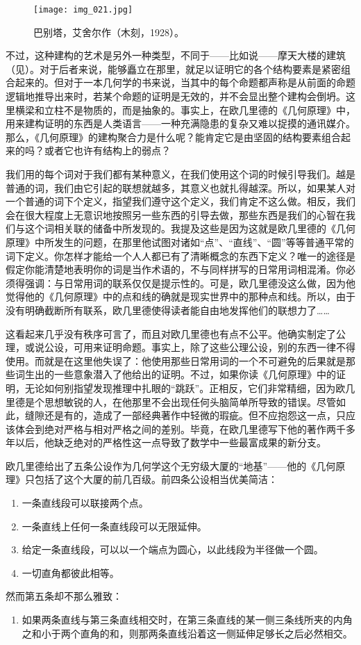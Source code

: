 \begin{figure}
\texttt{[image: img\_021.jpg]}
\caption[巴别塔，艾舍尔作。]
  {巴别塔，艾舍尔作（木刻，1928）。}
\end{figure}

不过，这种建构的艺术是另外一种类型，不同于——比如说——摩天大楼的建筑（见）。对于后者来说，能够矗立在那里，就足以证明它的各个结构要素是紧密组合起来的。但对于一本几何学的书来说，当其中的每个命题都声称是从前面的命题逻辑地推导出来时，若某个命题的证明是无效的，并不会显出整个建构会倒坍。这里横梁和立柱不是物质的，而是抽象的。事实上，在欧几里德的《几何原理》中，用来建构证明的东西是人类语言——一种充满隐患的复杂又难以捉摸的通讯媒介。那么，《几何原理》的建构聚合力是什么呢？能肯定它是由坚固的结构要素组合起来的吗？或者它也许有结构上的弱点？

我们用的每个词对于我们都有某种意义，在我们使用这个词的时候引导我们。越是普通的词，我们由它引起的联想就越多，其意义也就扎得越深。所以，如果某人对一个普通的词下个定义，指望我们遵守这个定义，我们肯定不这么做。相反，我们会在很大程度上无意识地按照另一些东西的引导去做，那些东西是我们的心智在我们与这个词相关联的储备中所发现的。我提及这些是因为这就是欧几里德的《几何原理》中所发生的问题，在那里他试图对诸如“点”、“直线”、“圆”等等普通平常的词下定义。你怎样才能给一个人人都已有了清晰概念的东西下定义？唯一的途径是假定你能清楚地表明你的词是当作术语的，不与同样拼写的日常用词相混淆。你必须得强调：与日常用词的联系仅仅是提示性的。可是，欧几里德没这么做，因为他觉得他的《几何原理》中的点和线的确就是现实世界中的那种点和线。所以，由于没有明确截断所有联系，欧几里德使得读者能自由地发挥他们的联想力了……

这看起来几乎没有秩序可言了，而且对欧几里德也有点不公平。他确实制定了公理，或说公设，可用来证明命题。事实上，除了这些公理公设，别的东西一律不得使用。而就是在这里他失误了：他使用那些日常用词的一个不可避免的后果就是那些词生出的一些意象潜入了他给出的证明。不过，如果你读《几何原理》中的证明，无论如何别指望发现推理中扎眼的“跳跃”。正相反，它们非常精细，因为欧几里德是个思想敏锐的人，在他那里不会出现任何头脑简单所导致的错误。尽管如此，缝隙还是有的，造成了一部经典著作中轻微的瑕疵。但不应抱怨这一点，只应该体会到绝对严格与相对严格之间的差别。毕竟，在欧几里德写下他的著作两千多年以后，他缺乏绝对的严格性这一点导致了数学中一些最富成果的新分支。

欧几里德给出了五条公设作为几何学这个无穷级大厦的“地基”——他的《几何原理》只包括了这个大厦的前几百级。前四条公设相当优美简洁：
\begin{enumerate}
\item 一条直线段可以联接两个点。
\item 一条直线上任何一条直线段可以无限延伸。
\item 给定一条直线段，可以以一个端点为圆心，以此线段为半径做一个圆。
\item 一切直角都彼此相等。
\end{enumerate}
然而第五条却不那么雅致：
\begin{enumerate}[resume]
\item 如果两条直线与第三条直线相交时，在第三条直线的某一侧三条线所夹的内角之和小于两个直角的和，则那两条直线沿着这一侧延伸足够长之后必然相交。
\end{enumerate}

